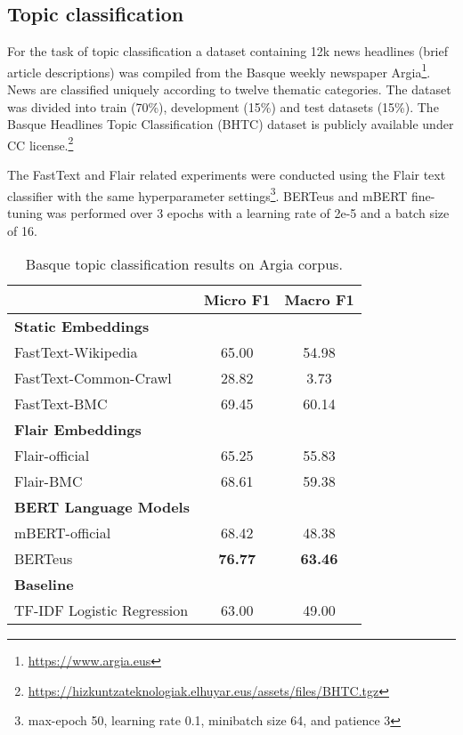 \documentclass[10pt, a4paper]{article}
\begin{document}
\subsection{Topic classification}\label{sec:topic}

For the task of topic classification a dataset containing 12k news headlines (brief article descriptions) was compiled from the Basque weekly newspaper Argia\footnote{\scriptsize \url{https://www.argia.eus}}. News are classified uniquely according to twelve thematic categories. The dataset was divided into train (70\%), development (15\%) and test datasets (15\%). The Basque Headlines Topic Classification (BHTC) dataset is publicly available under CC license.\footnote{\scriptsize \url{https://hizkuntzateknologiak.elhuyar.eus/assets/files/BHTC.tgz}}

The FastText and Flair related experiments were conducted using the Flair text classifier with the same hyperparameter settings\footnote{max-epoch 50, learning rate 0.1, minibatch size 64, and  patience 3 }. BERTeus and mBERT fine-tuning was performed over 3 epochs with a learning rate of 2e-5 and a batch size of 16.

\begin{table}[!ht]\small
\centering
\begin{tabular}{@{\hspace{0.3cm}}lcc} \hline
 {\textbf{}} & {\textbf{Micro F1}} &  {\textbf{Macro F1}} \\ \hline
\textbf{Static Embeddings} & & \\
FastText-Wikipedia & 65.00 & 54.98 \\
FastText-Common-Crawl & 28.82 & 3.73  \\
FastText-BMC  & 69.45 & 60.14 \\
\hline%
\textbf{Flair Embeddings}\\
Flair-official & 65.25 & 55.83 \\
Flair-BMC  & 68.61 & 59.38  \\ \hline
\textbf{BERT Language Models}\\
mBERT-official  & 68.42 & 48.38  \\
BERTeus  & \textbf{76.77}	& \textbf{63.46}  \\
\hline
\textbf{Baseline} \\
TF-IDF Logistic Regression & 63.00 & 49.00 \\
\hline
\end{tabular}
\caption{Basque topic classification results on Argia corpus.}\label{tab:topic}
\end{table}
\end{document}
